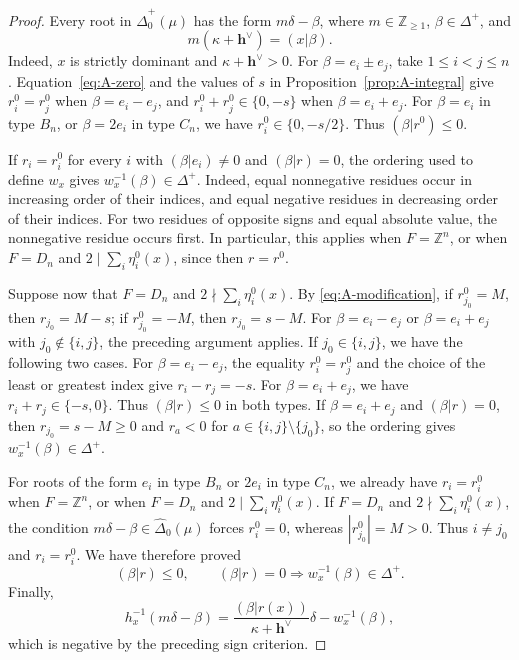 \documentclass[11pt,a4paper]{amsart}
\newcommand{\ZZ}{\mathbb Z}
\theoremstyle{plain}
\numberwithin{equation}{section}
\newenvironment{pf}{\begin{proof}}{\end{proof}}
\begin{document}
\begin{pf}
Every root in \(\widehat\Delta_0^+(\mu)\) has the form
\(m\delta-\beta\), where \(m\in\ZZ_{\ge1}\), \(\beta\in\Delta^+\), and
\begin{equation}
m(\kappa+\mathbf{h}^\vee)=(x|\beta).
\label{eq:A-zero}
\end{equation}
Indeed, \(x\) is strictly dominant and \(\kappa+\mathbf{h}^\vee>0\).
For \(\beta=e_i\pm e_j\), take \(1\le i<j\le n\).
Equation~\eqref{eq:A-zero} and the values of \(s\) in
Proposition~\ref{prop:A-integral} give \(r_i^0=r_j^0\) when
\(\beta=e_i-e_j\), and \(r_i^0+r_j^0\in\{0,-s\}\) when
\(\beta=e_i+e_j\). For \(\beta=e_i\) in type \(B_n\), or
\(\beta=2e_i\) in type \(C_n\), we have
\(r_i^0\in\{0,-s/2\}\). Thus \((\beta|r^0)\le0\).

If \(r_i=r_i^0\) for every \(i\) with \((\beta|e_i)\ne0\)
and \((\beta|r)=0\), the ordering used to define \(w_x\) gives
\(w_x^{-1}(\beta)\in\Delta^+\).
Indeed, equal nonnegative residues occur in increasing order of
their indices, and equal negative residues in decreasing order of
their indices. For two residues of opposite signs and equal absolute
value, the nonnegative residue occurs first.
In particular, this applies when \(F=\ZZ^n\), or when \(F=D_n\)
and \(2\mid\sum_i\eta_i^0(x)\), since then \(r=r^0\).

Suppose now that \(F=D_n\) and \(2\nmid\sum_i\eta_i^0(x)\).
By \eqref{eq:A-modification}, if \(r_{j_0}^0=M\), then
\(r_{j_0}=M-s\); if \(r_{j_0}^0=-M\), then \(r_{j_0}=s-M\).
For \(\beta=e_i-e_j\) or \(\beta=e_i+e_j\) with
\(j_0\notin\{i,j\}\), the preceding argument applies.
If \(j_0\in\{i,j\}\), we have the following two cases.
For \(\beta=e_i-e_j\), the equality \(r_i^0=r_j^0\) and the
choice of the least or greatest index give \(r_i-r_j=-s\).
For \(\beta=e_i+e_j\), we have \(r_i+r_j\in\{-s,0\}\).
Thus \((\beta|r)\le0\) in both types.
If \(\beta=e_i+e_j\) and \((\beta|r)=0\), then
\(r_{j_0}=s-M\ge0\) and \(r_a<0\) for
\(a\in\{i,j\}\setminus\{j_0\}\), so the ordering gives
\(w_x^{-1}(\beta)\in\Delta^+\).

For roots of the form \(e_i\) in type \(B_n\) or \(2e_i\) in
type \(C_n\), we already have \(r_i=r_i^0\) when \(F=\ZZ^n\),
or when \(F=D_n\) and \(2\mid\sum_i\eta_i^0(x)\).
If \(F=D_n\) and \(2\nmid\sum_i\eta_i^0(x)\), the condition
\(m\delta-\beta\in\widehat\Delta_0(\mu)\) forces
\(r_i^0=0\), whereas \(|r_{j_0}^0|=M>0\). Thus \(i\ne j_0\)
and \(r_i=r_i^0\). We have therefore proved
\[
(\beta|r)\le0,\qquad
(\beta|r)=0\Longrightarrow w_x^{-1}(\beta)\in\Delta^+.
\]
Finally,
\[
h_x^{-1}(m\delta-\beta)=
\frac{(\beta|r(x))}{\kappa+\mathbf{h}^\vee}\delta-w_x^{-1}(\beta),
\]
which is negative by the preceding sign criterion.

\end{pf}
\end{document}
